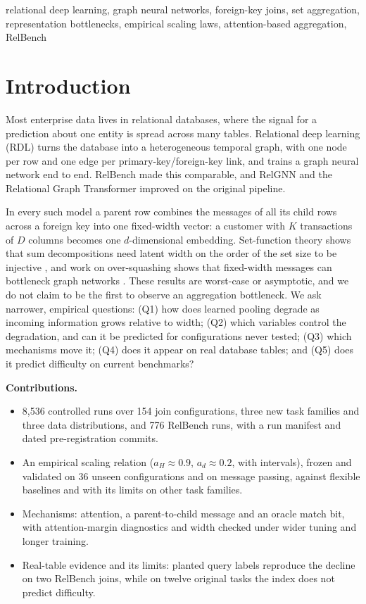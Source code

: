 \documentclass[conference]{IEEEtran}
\begin{document}
\begin{IEEEkeywords}
relational deep learning, graph neural networks, foreign-key joins, set aggregation, representation bottlenecks, empirical scaling laws, attention-based aggregation, RelBench
\end{IEEEkeywords}

\section{Introduction}

Most enterprise data lives in relational databases, where the signal for a prediction about one entity is spread across many tables. Relational deep learning (RDL) \cite{fey2024relational} turns the database into a heterogeneous temporal graph, with one node per row and one edge per primary-key/foreign-key link, and trains a graph neural network end to end. RelBench \cite{robinson2024relbench} made this comparable, and RelGNN \cite{chen2025relgnn} and the Relational Graph Transformer \cite{dwivedi2025relgt} improved on the original pipeline.

In every such model a parent row combines the messages of all its child rows across a foreign key into one fixed-width vector: a customer with $K$ transactions of $D$ columns becomes one $d$-dimensional embedding. Set-function theory shows that sum decompositions need latent width on the order of the set size to be injective \cite{wagstaff2019limitations,wagstaff2022universal}, and work on over-squashing shows that fixed-width messages can bottleneck graph networks \cite{alon2021bottleneck,topping2022oversquashing,digiovanni2023oversquashing}. These results are worst-case or asymptotic, and we do not claim to be the first to observe an aggregation bottleneck. We ask narrower, empirical questions:
(Q1) how does learned pooling degrade as incoming information grows relative to width;
(Q2) which variables control the degradation, and can it be predicted for configurations never tested;
(Q3) which mechanisms move it;
(Q4) does it appear on real database tables; and
(Q5) does it predict difficulty on current benchmarks?

\textbf{Contributions.}
\begin{itemize}
\item 8{,}536 controlled runs over 154 join configurations, three new task families and three data distributions, and 776 RelBench runs, with a run manifest and dated pre-registration commits.
\item An empirical scaling relation ($a_H \approx 0.9$, $a_d \approx 0.2$, with intervals), frozen and validated on 36 unseen configurations and on message passing, against flexible baselines and with its limits on other task families.
\item Mechanisms: attention, a parent-to-child message and an oracle match bit, with attention-margin diagnostics and width checked under wider tuning and longer training.
\item Real-table evidence and its limits: planted query labels reproduce the decline on two RelBench joins, while on twelve original tasks the index does not predict difficulty.
\end{itemize}
\end{document}
